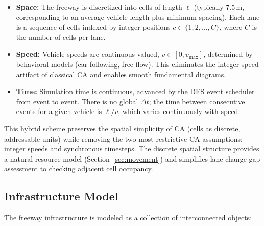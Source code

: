 \documentclass[review,authoryear]{elsarticle}
\begin{document}
\begin{itemize}
    \item \textbf{Space:} The freeway is discretized into cells of length $\ell$ (typically 7.5\,m, corresponding to an average vehicle length plus minimum spacing). Each lane is a sequence of cells indexed by integer positions $c \in \{1, 2, \ldots, C\}$, where $C$ is the number of cells per lane.

    \item \textbf{Speed:} Vehicle speeds are continuous-valued, $v \in [0, v_{\max}]$, determined by behavioral models (car following, free flow). This eliminates the integer-speed artifact of classical CA and enables smooth fundamental diagrams.

    \item \textbf{Time:} Simulation time is continuous, advanced by the DES event scheduler from event to event. There is no global $\Delta t$; the time between consecutive events for a given vehicle is $\ell / v$, which varies continuously with speed.
\end{itemize}

This hybrid scheme preserves the spatial simplicity of CA (cells as discrete, addressable units) while removing the two most restrictive CA assumptions: integer speeds and synchronous timesteps. The discrete spatial structure provides a natural resource model (Section~\ref{sec:movement}) and simplifies lane-change gap assessment to checking adjacent cell occupancy.

\subsection{Infrastructure Model}
\label{sec:infrastructure}

The freeway infrastructure is modeled as a collection of interconnected objects:
\end{document}
